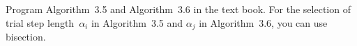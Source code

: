 \begin{problem}
  Program Algorithm~3.5 and Algorithm~3.6 in the text book.  For the selection of trial step length~$\alpha_i$ in Algorithm~3.5 and $\alpha_j$ in Algorithm~3.6, you can use bisection.
\end{problem}
